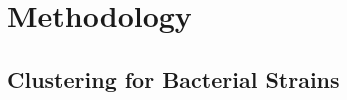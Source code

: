 \chapter{Methodology}\label{chap:methodology}
\section{\krap{}}
\section{Clustering for Bacterial Strains}